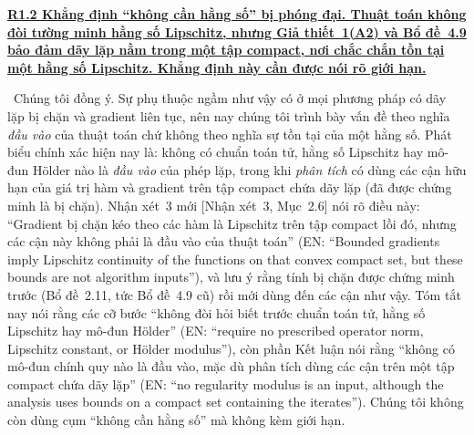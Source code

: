 \documentclass[11pt]{article}
\newcommand{\response}[1]{\smallskip\noindent{\color{blue!60!black}\textbf{Trả lời.}}\ #1\par\medskip}
\newcommand{\loc}[1]{\textcolor{blue!50!black}{[#1]}}
\newcommand{\en}[1]{{\color{gray}\small(EN: ``#1'')}}
\newenvironment{point}[1]{\medskip\noindent\textbf{\uline{#1}}\par}{\par}
\begin{document}
\begin{point}{R1.2 Khẳng định ``không cần hằng số'' bị phóng đại. Thuật toán không
đòi tường minh hằng số Lipschitz, nhưng Giả thiết~1(A2) và Bổ đề~4.9 bảo đảm
dãy lặp nằm trong một tập compact, nơi chắc chắn tồn tại một hằng số Lipschitz. Khẳng định
này cần được nói rõ giới hạn.}
\response{Chúng tôi đồng ý. Sự phụ thuộc ngầm như vậy có ở mọi phương pháp có dãy lặp bị chặn
và gradient liên tục, nên nay chúng tôi trình bày vấn đề theo nghĩa \emph{đầu vào} của thuật toán
chứ không theo nghĩa sự tồn tại của một hằng số. Phát biểu chính xác hiện nay là: không có
chuẩn toán tử, hằng số Lipschitz hay mô-đun H\"older nào là \emph{đầu vào} của
phép lặp, trong khi \emph{phân tích} có dùng các cận hữu hạn của giá trị hàm và
gradient trên tập compact chứa dãy lặp (đã được chứng minh là bị chặn). Nhận xét~3
mới \loc{Nhận xét~3, Mục~2.6} nói rõ điều này: ``Gradient bị chặn kéo theo các hàm là
Lipschitz trên tập compact lồi đó, nhưng các cận này không phải là đầu vào của
thuật toán'' \en{Bounded gradients imply
Lipschitz continuity of the functions on that convex compact set, but these bounds are
not algorithm inputs}, và lưu ý rằng tính bị chặn được chứng minh trước (Bổ đề~2.11, tức
Bổ đề~4.9 cũ) rồi mới dùng đến các cận như vậy. Tóm tắt nay nói rằng
các cỡ bước ``không đòi hỏi biết trước chuẩn toán tử, hằng số Lipschitz hay mô-đun H\"older''
\en{require no prescribed operator norm, Lipschitz constant, or H\"older modulus},
còn phần Kết luận nói
rằng ``không có mô-đun chính quy nào là đầu vào, mặc dù phân tích dùng các cận trên một tập compact
chứa dãy lặp'' \en{no regularity modulus is an input, although the analysis uses bounds on a compact
set containing the iterates}. Chúng tôi không còn dùng cụm ``không cần hằng số'' mà không kèm giới hạn.}
\end{point}
\end{document}
